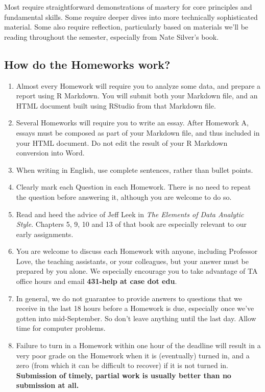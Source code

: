 \documentclass[
]{book}
\providecommand{\tightlist}{%
  \setlength{\itemsep}{0pt}\setlength{\parskip}{0pt}}
\begin{document}
Most require straightforward demonstrations of mastery for core principles and fundamental skills. Some require deeper dives into more technically sophisticated material. Some also require reflection, particularly based on materials we'll be reading throughout the semester, especially from Nate Silver's book.

\hypertarget{how-do-the-homeworks-work}{%
\subsection{How do the Homeworks work?}\label{how-do-the-homeworks-work}}

\begin{enumerate}
\def\labelenumi{\arabic{enumi}.}
\tightlist
\item
  Almost every Homework will require you to analyze some data, and prepare a report using R Markdown. You will submit both your Markdown file, and an HTML document built using RStudio from that Markdown file.
\item
  Several Homeworks will require you to write an essay. After Homework A, essays must be composed as part of your Markdown file, and thus included in your HTML document. Do not edit the result of your R Markdown conversion into Word.
\item
  When writing in English, use complete sentences, rather than bullet points.
\item
  Clearly mark each Question in each Homework. There is no need to repeat the question before answering it, although you are welcome to do so.
\item
  Read and heed the advice of Jeff Leek in \emph{The Elements of Data Analytic Style}. Chapters 5, 9, 10 and 13 of that book are especially relevant to our early assignments.
\item
  You are welcome to discuss each Homework with anyone, including Professor Love, the teaching assistants, or your colleagues, but your answer must be prepared by you alone. We especially encourage you to take advantage of TA office hours and email \textbf{431-help at case dot edu}.
\item
  In general, we do not guarantee to provide answers to questions that we receive in the last 18 hours before a Homework is due, especially once we've gotten into mid-September. So don't leave anything until the last day. Allow time for computer problems.
\item
  Failure to turn in a Homework within one hour of the deadline will result in a very poor grade on the Homework when it is (eventually) turned in, and a zero (from which it can be difficult to recover) if it is not turned in. \textbf{Submission of timely, partial work is usually better than no submission at all.}

\end{enumerate}
\end{document}
